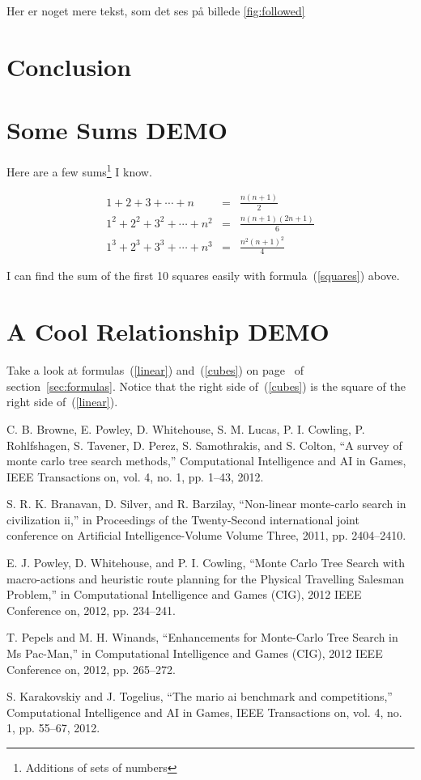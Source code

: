 \documentclass[10pt,a4paper,twoside]{article}
\begin{document}
Her er noget mere tekst, som det ses på billede \ref{fig:followed}

\section{Conclusion}

\section{Some Sums DEMO}

Here are a few sums\footnote{Additions of sets of numbers}  I know.\label{sec:formulas}

\begin{eqnarray}
1+2+3+\cdots+n&=&\frac{n(n+1)}{2}\label{linear}\\
1^2+2^2+3^2+\cdots+n^2&=& \frac{n(n+1)(2n+1)}{6}\label{squares}\\
1^3+2^3+3^3+\cdots+n^3&=& \frac{n^2(n+1)^2}{4}\label{cubes}
\end{eqnarray}

I can find the sum of the first 10 squares easily with formula~(\ref{squares}) above.

\pagebreak

\section{A Cool Relationship DEMO}

Take a look at formulas~(\ref{linear}) and~(\ref{cubes}) on
page~\pageref{linear} of section~\ref{sec:formulas}. Notice that the
right side of~(\ref{cubes}) is the square of the right side
of~(\ref{linear}).


\begin{thebibliography}{99}

  C. B. Browne, E. Powley, D. Whitehouse, S. M. Lucas, P. I. Cowling, P. Rohlfshagen, S. Tavener, D. Perez, S. Samothrakis, and S. Colton, “A survey of monte carlo tree search methods,” Computational Intelligence and AI in Games, IEEE Transactions on, vol. 4, no. 1, pp. 1–43, 2012.

S. R. K. Branavan, D. Silver, and R. Barzilay, “Non-linear monte-carlo search in civilization ii,” in Proceedings of the Twenty-Second international joint conference on Artificial Intelligence-Volume Volume Three, 2011, pp. 2404–2410.

E. J. Powley, D. Whitehouse, and P. I. Cowling, “Monte Carlo Tree Search with macro-actions and heuristic route planning for the Physical Travelling Salesman Problem,” in Computational Intelligence and Games (CIG), 2012 IEEE Conference on, 2012, pp. 234–241.

T. Pepels and M. H. Winands, “Enhancements for Monte-Carlo Tree Search in Ms Pac-Man,” in Computational Intelligence and Games (CIG), 2012 IEEE Conference on, 2012, pp. 265–272.

S. Karakovskiy and J. Togelius, “The mario ai benchmark and competitions,” Computational Intelligence and AI in Games, IEEE Transactions on, vol. 4, no. 1, pp. 55–67, 2012.

\end{thebibliography}
\end{document}
